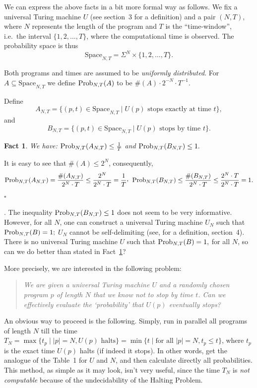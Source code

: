 \documentclass[12pt,twoside,openright]{report}
\newcommand{\QED}{\hfill $\square$}
\newcommand{\Prob}{{\rm Prob}}
\newtheorem{fact}[thm]{Fact}
\newcommand{\myproof}{\noindent {\em Proof.}  }
\newcommand{\Space}{\mbox{Space}}
\begin{document}
We can express the above facts in a bit more formal way as follows.  We fix a universal Turing machine $U$ (see section~3 for a definition) 
and a pair $(N,T)$, where $N$ represents the length of the program and $T$ is the ``time-window'', i.e.\ the interval $\{1,2,\ldots ,T\}$, where the computational time is observed.  The probability space is thus \[\Space_{N,T} = \Sigma^{N} \times \{1,2,\ldots ,T\}.\]

Both programs and times are assumed to be {\it uniformly distributed}. For $A \subseteq \Space_{N,T}$ we define  $\Prob_{N,T}(A)$ to be $\#(A)\cdot 2^{-N} \cdot T^{-1}$.

\medskip


Define
\[A_{N,T} = \{(p,t)\in \Space_{N,T}  \mid U(p) \mbox{ stops exactly at time $t$}\},\]
\noindent and
\[B_{N,T} = \{(p,t)\in \Space_{N,T}  \mid U(p) \mbox{ stops  by time $t$}\}.\]




\medskip

\begin{fact}
\label{prel}  We have: $\Prob_{N,T}(A_{N,T})  \le  \frac{1}{T}$ and  $\Prob_{N,T}(B_{N,T}) \le  1.$ 
\end{fact}

\myproof It is easy to see that $\# (A) \le 2^{N}$, consequently,
$$\Prob_{N,T}(A_{N,T}) = \frac{\#(A_{N,T})}{2^{N} \cdot T} \le \frac{2^{N}}{2^{N} \cdot T} = \frac{1}{T}\raisebox{0.4ex}{,} \phantom{x} \Prob_{N,T}(B_{N,T}) \le \frac{\#(B_{N,T})}{2^{N} \cdot T}\le  \frac{2^{N} \cdot T}{2^{N} \cdot T} = 1.$$   \QED

\medskip

. The inequality  $\Prob_{N,T}(B_{N,T}) \le  1$ does not seem to be very informative. However, for all $N$, one can construct a universal Turing machine $U_N$ such that $\Prob_{N,T}(B) = 1;$  $U_{N}$ cannot be self-delimiting (see, for a definition,  section~4).  There is no universal Turing machine  $U$ such that $\Prob_{N,T}(B) = 1, $ for all $N$, so  can we do better than stated in Fact~\ref{prel}?


More precisely, we are interested in the following problem: 
\begin{quote} \it We are given a universal Turing machine $U$ and a randomly chosen program $p$ of length $N$ that we know  not to stop by time $t$. Can we effectively evaluate the `probability' that $U(p)$ eventually stops? 
\end{quote}

An obvious way to proceed is the following. Simply, run in parallel all programs of length $N$ till the time  $T_{N} = \max\{t_{p} \mid  |p|=N, U(p) \mbox{  halts} \} = \min\{t\mid \mbox{for all } |p|=N, t_{p} \le t\}$, where $t_{p} $ is the exact time $U(p)$ halts (if indeed it stops). In other words, get the analogue of the Table~1 for $U$ and $N$, and then calculate directly all probabilities. This method, as simple as it may look, isn't very useful, since the time $T_{N}$ is {\it not computable}   because of the undecidability of the Halting Problem.
\end{document}
